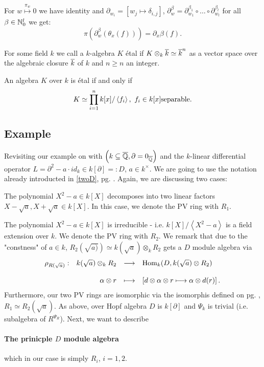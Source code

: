 For $w \stackrel{\pi_w}{\mapsto} 0$ we have identity and $\partial_{w_i} = [w_j \longmapsto \delta_{i,j}]$, $\partial_w^\beta = \partial_{w_1}^{\beta_1} \circ \ldots \circ \partial_{w_l}^{\beta_l}$ for all $\beta \in \nz_0^l$ we get:
$$\pi(\partial_w^\beta(\theta_x(f))) = \partial_x\beta(f).$$
\begin{defi}
For some field $k$ we call a $k$-algebra $K$ \'{e}tal if $K \otimes_k \ov{k} \simeq \ov{k}^n$ as a vector space over the algebraic closure $\ov{k}$ of $k$ and $n \geq n$ an integer.
\end{defi}
\bmk An algebra $K$ over $k$ is \'{e}tal if and only if
$$K \simeq \prod_{i=1}^n k[x]/\left<f_i\right>,\ f_i \in k[x] \trm{separable}.$$
\subsection{Example} Revisiting our example on \pageref{twoD} with $\left(k \subseteq \ov{\qz}, \partial = 0_{\ov{\qz}}\right)$ and the $k$-linear differential operator $L = \partial^2 - a \cdot id_k \in k[\partial] =: D$, $a \in k^\times$. We are going to use the notation already introducted in \ref{twoD}, pg. \pageref{twoD}. Again, we are discussing two cases:
\bd
\item[reducible] The polynomial $X^2 - a \in k[X]$ decomposes into two linear factors $X - \sqrt{a}, X + \sqrt{a} \in k[X]$. In this case, we denote the PV ring with $R_1$.
\item[irreducible] The polynomial $X^2 - a \in k[X]$ is irreducible - i.e. $k[X]/\left<X^2 - a\right>$ is a field extension over $k$. We denote the PV ring with $R_2$.
\ed
We remark that due to the "constness" of $a \in k$, $R_2(\sqrt{a)}) \simeq k(\sqrt{a}) \otimes_k R_2$ gets a $D$ module algebra via
$$\bao{rrcl}
\rho_{R(\sqrt{a})} : & k(\sqrt{a}) \otimes_k R_2 &\longrightarrow &\trm{Hom}_k(D, k(\sqrt{a}) \otimes R_2)\\
&&&\\
&\alpha \otimes r &\longmapsto & \left[d \otimes \alpha \otimes r \longmapsto \alpha \otimes d(r)\right].\\\ea$$
Furthermore, our two PV rings are isomorphic via the isomorphis defined on pg. \pageref{PVisomorph}, $R_1 \simeq R_2(\sqrt{a})$. As above, over Hopf algebra $D$ is $k[\partial]$ and $\Psi_k$ is trivial (i.e. subalgebra of $R^{\Psi_R}$). Next, we want to describe
\paragraph{The prinicple $D$ module algebra}
which in our case is simply $R_i$, $i = 1, 2$.
